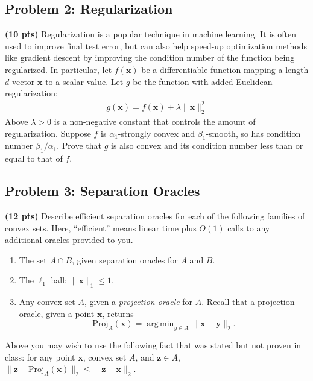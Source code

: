 \documentclass[10pt]{article}
\newcommand{\bv}[1]{\mathbf{#1}}
\DeclareMathOperator*{\argmin}{arg\,min}
\begin{document}
\subsection{Problem 2: Regularization}
\textbf{(10 pts)}
Regularization is a popular technique in machine learning. It is often used to improve final test error, but can also help speed-up optimization methods like gradient descent by improving the condition number of the function being regularized. In particular, let $f(\bv{x})$ be a differentiable function mapping a length $d$ vector $\bv{x}$ to a scalar value. Let $g$ be the function with added Euclidean regularization:
	\begin{align*}
		g(\bv{x}) = f(\bv{x}) + \lambda \|\bv{x}\|_2^2
	\end{align*}  Above $\lambda > 0$ is a non-negative constant that controls the amount of regularization. Suppose $f$ is $\alpha_1$-strongly convex and $\beta_1$-smooth, so has condition number $\beta_1/\alpha_1$. Prove that $g$ is also convex and its condition number less than or equal to that of $f$.

\subsection{Problem 3: Separation Oracles}
\textbf{(12 pts)} Describe efficient separation oracles for each of the following families of convex sets.  Here, ``efficient'' means linear time plus $O(1)$ calls to any additional oracles provided to you.

\begin{enumerate}[label=(\alph*)]
	\item
	The set $A \cap B$, given separation oracles for $A$ and $B$.
	
	\item
	The $\ell_1$ ball: $\| \bv{x} \|_1 \leq 1$.
	
	\item
	Any convex set $A$, given a \emph{projection oracle} for $A$. Recall that a projection oracle, given a point $\bv{x}$, returns
	\begin{equation*}
		\text{Proj}_A(\bv{x}) =  \argmin_{y \in A} \| \bv{x} - \bv{y} \|_2.
	\end{equation*}
	
\end{enumerate}
Above you may wish to use the following fact that was stated but not proven in class: for any point $\bv{x}$, convex set $A$, and $\bv{z}\in A$, $\|\bv{z}-\text{Proj}_A(\bv{x})\|_2 \leq \|\bv{z} - \bv{x}\|_2$.
\end{document}

